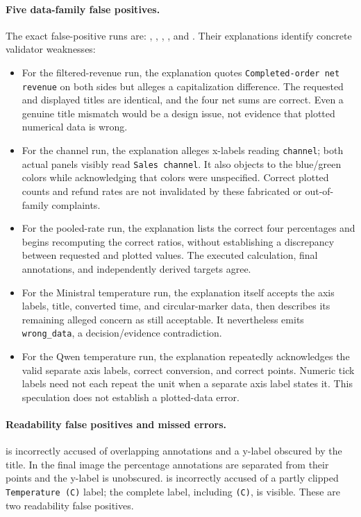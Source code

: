 \documentclass[11pt]{article}
\begin{document}
\paragraph{Five data-family false positives.}
The exact false-positive runs are:
,
,
,
, and
.
Their explanations identify concrete validator weaknesses:
\begin{itemize}
\item For the filtered-revenue run, the explanation quotes
\texttt{Completed-order net revenue} on both sides but alleges a capitalization
difference. The requested and displayed titles are identical, and the four
net sums are correct. Even a genuine title mismatch would be a design issue,
not evidence that plotted numerical data is wrong.
\item For the channel run, the explanation alleges x-labels reading
\texttt{channel}; both actual panels visibly read \texttt{Sales channel}.
It also objects to the blue/green colors while acknowledging that colors
were unspecified. Correct plotted counts and refund rates are not invalidated
by these fabricated or out-of-family complaints.
\item For the pooled-rate run, the explanation lists the correct four
percentages and begins recomputing the correct ratios, without establishing
a discrepancy between requested and plotted values. The executed calculation,
final annotations, and independently derived targets agree.
\item For the Ministral temperature run, the explanation itself accepts the
axis labels, title, converted time, and circular-marker data, then describes
its remaining alleged concern as still acceptable. It nevertheless emits
\texttt{wrong\_data}, a decision/evidence contradiction.
\item For the Qwen temperature run, the explanation repeatedly acknowledges
the valid separate axis labels, correct conversion, and correct points.
Numeric tick labels need not each repeat the unit when a separate axis label
states it. This speculation does not establish a plotted-data error.
\end{itemize}

\paragraph{Readability false positives and missed errors.}
 is incorrectly accused of overlapping
annotations and a y-label obscured by the title. In the final image the
percentage annotations are separated from their points and the y-label
is unobscured.
 is incorrectly accused of a partly clipped
\texttt{Temperature (C)} label; the complete label, including \texttt{(C)},
is visible.
These are two readability false positives.
\end{document}
